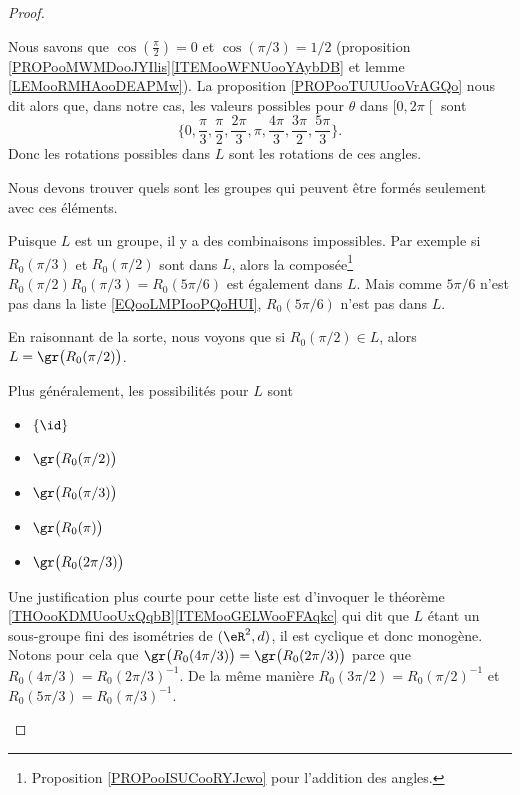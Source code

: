 \begin{proof}
\begin{subproof}
		Nous savons que \( \cos(\frac{ \pi }{2})=0\) et \( \cos(\pi/3)=1/2\) (proposition \ref{PROPooMWMDooJYIlis}\ref{ITEMooWFNUooYAybDB} et lemme \ref{LEMooRMHAooDEAPMw}). La proposition \ref{PROPooTUUUooVrAGQo} nous dit alors que, dans notre cas, les valeurs possibles pour \( \theta\) dans \( \mathopen[ 0 , 2\pi \mathclose[\) sont
		\begin{equation}        \label{EQooLMPIooPQoHUI}
			\{ 0,\frac{ \pi }{ 3 },\frac{ \pi }{ 2 }, \frac{ 2\pi }{ 3 }, \pi,\frac{ 4\pi }{ 3 }, \frac{ 3\pi }{ 2 },\frac{ 5\pi }{ 3 } \}.
		\end{equation}
		Donc les rotations possibles dans \( L\) sont les rotations de ces angles.

		Nous devons trouver quels sont les groupes qui peuvent être formés seulement avec ces éléments.


		Puisque \( L\) est un groupe, il y a des combinaisons impossibles. Par exemple si \( R_0(\pi/3)\) et \( R_0(\pi/2)\) sont dans \( L\), alors la composée\footnote{Proposition \ref{PROPooISUCooRYJcwo} pour l'addition des angles.} \( R_0(\pi/2)R_0(\pi/3)=R_0(5\pi/6)\) est également dans \( L\). Mais comme \( 5\pi/6\) n'est pas dans la liste \eqref{EQooLMPIooPQoHUI}, \( R_0(5\pi/6)\) n'est pas dans \( L\).

		En raisonnant de la sorte, nous voyons que si \( R_0(\pi/2)\in L\), alors \( L=\gr\big( R_0(\pi/2) \big)\).

		\spitem[La liste]
		Plus généralement, les possibilités pour \( L\) sont
		\begin{itemize}
			\item \( \{ \id \}\)
			\item \( \gr\big( R_0(\pi/2) \big)\)
			\item \( \gr\big( R_0(\pi/3) \big)\)
			\item \( \gr\big( R_0(\pi) \big)\)
			\item \( \gr\big( R_0(2\pi/3) \big)\)
		\end{itemize}
		Une justification plus courte pour cette liste est d'invoquer le théorème \ref{THOooKDMUooUxQqbB}\ref{ITEMooGELWooFFAqkc} qui dit que \( L\) étant un sous-groupe fini des isométries de \( (\eR^2,d)\), il est cyclique et donc monogène. Notons pour cela que \( \gr\big( R_0(4\pi/3) \big)=\gr\big( R_0(2\pi/3) \big)\) parce que \( R_0(4\pi/3)=R_0(2\pi/3)^{-1}\). De la même manière \( R_0(3\pi/2)=R_0(\pi/2)^{-1}\) et \( R_0(5\pi/3)=R_0(\pi/3)^{-1}\).


\end{subproof}
\end{proof}
